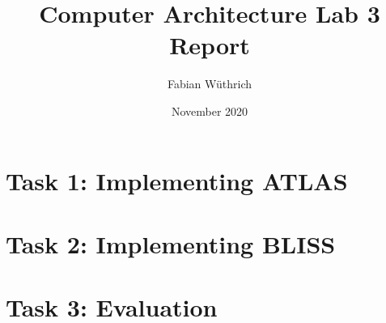 \documentclass[a4paper]{article}
\begin{document}
\title{Computer Architecture Lab 3 Report}
\author{Fabian Wüthrich}
\date{November 2020}
\maketitle

\section*{Task 1: Implementing ATLAS}
\section*{Task 2: Implementing BLISS}
\section*{Task 3: Evaluation}
\end{document}
